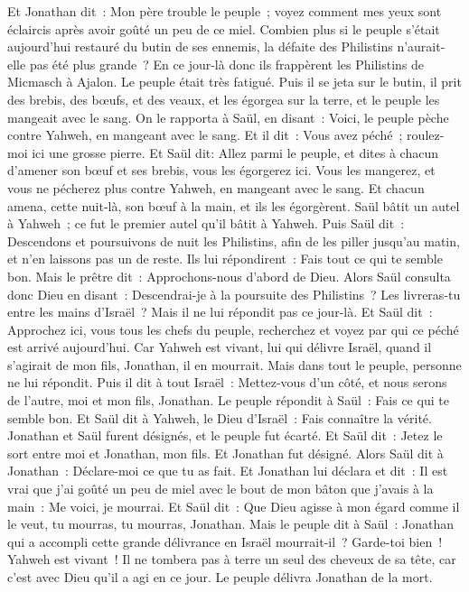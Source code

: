 \begin{multicols}{2}
Et Jonathan dit~: Mon père trouble le peuple~; voyez comment mes yeux sont éclaircis après avoir goûté un peu de ce miel.
Combien plus si le peuple s'était aujourd'hui restauré du butin de ses ennemis, la défaite des Philistins n'aurait-elle pas été plus grande~?
En ce jour-là donc ils frappèrent les Philistins de Micmasch à Ajalon. Le peuple était très fatigué.
Puis il se jeta sur le butin, il prit des brebis, des bœufs, et des veaux, et les égorgea sur la terre, et le peuple les mangeait avec le sang.
On le rapporta à Saül, en disant~: Voici, le peuple pèche contre Yahweh, en mangeant avec le sang. Et il dit~: Vous avez péché~; roulez-moi ici une grosse pierre.
Et Saül dit: Allez parmi le peuple, et dites à chacun d'amener son bœuf et ses brebis, vous les égorgerez ici. Vous les mangerez, et vous ne pécherez plus contre Yahweh, en mangeant avec le sang. Et chacun amena, cette nuit-là, son bœuf à la main, et ils les égorgèrent.
Saül bâtit un autel à Yahweh~; ce fut le premier autel qu'il bâtit à Yahweh.
Puis Saül dit~: Descendons et poursuivons de nuit les Philistins, afin de les piller jusqu'au matin, et n'en laissons pas un de reste. Ils lui répondirent~: Fais tout ce qui te semble bon. Mais le prêtre dit~: Approchons-nous d'abord de Dieu.
Alors Saül consulta donc Dieu en disant~: Descendrai-je à la poursuite des Philistins~? Les livreras-tu entre les mains d'Israël~? Mais il ne lui répondit pas ce jour-là.
Et Saül dit~: Approchez ici, vous tous les chefs du peuple, recherchez et voyez par qui ce péché est arrivé aujourd'hui.
Car Yahweh est vivant, lui qui délivre Israël, quand il s'agirait de mon fils, Jonathan, il en mourrait. Mais dans tout le peuple, personne ne lui répondit.
Puis il dit à tout Israël~: Mettez-vous d'un côté, et nous serons de l'autre, moi et mon fils, Jonathan. Le peuple répondit à Saül~: Fais ce qui te semble bon.
Et Saül dit à Yahweh, le Dieu d'Israël~: Fais connaître la vérité. Jonathan et Saül furent désignés, et le peuple fut écarté.
Et Saül dit~: Jetez le sort entre moi et Jonathan, mon fils. Et Jonathan fut désigné.
Alors Saül dit à Jonathan~: Déclare-moi ce que tu as fait. Et Jonathan lui déclara et dit~: Il est vrai que j'ai goûté un peu de miel avec le bout de mon bâton que j'avais à la main~: Me voici, je mourrai.
Et Saül dit~: Que Dieu agisse à mon égard comme il le veut, tu mourras, tu mourras, Jonathan.
Mais le peuple dit à Saül~: Jonathan qui a accompli cette grande délivrance en Israël mourrait-il~? Garde-toi bien~! Yahweh est vivant~! Il ne tombera pas à terre un seul des cheveux de sa tête, car c'est avec Dieu qu'il a agi en ce jour. Le peuple délivra Jonathan de la mort.

\end{multicols}
